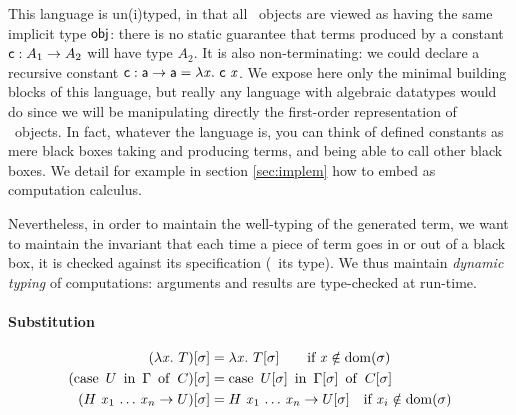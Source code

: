 \documentclass[9pt]{sigplanconf}
\begin{document}
This language is un(i)typed, in that all \LF\ objects are viewed as
having the same implicit type $\text{\textsf{obj}}$: there is no static
guarantee that terms produced by a constant $\text{\textsf{c}} : A_1\to A_2$ will
have type $A_2$. It is also non-terminating: we could declare a
recursive constant $\text{\textsf{c}} : \text{\textsf{a}}\to \text{\textsf{a}} = \lambda{\ensuremath{\text{\textit{x}}}}.\  {\text{\textsf{c}}}\ 
{\text{\textit{x}}}$. We expose here only the minimal building blocks of this
language, but really any language with algebraic datatypes would do
since we will be manipulating directly the first-order representation
of \LF\ objects. In fact, whatever the language is, you can think of
defined constants as mere black boxes taking and producing terms, and
being able to call other black boxes. We detail for example in section
\ref{sec:implem} how to embed  as computation calculus.

Nevertheless, in order to maintain the well-typing of the generated
term, we want to maintain the invariant that each time a piece of term
goes in or out of a black box, it is checked against its specification
(\ie\ its type). We thus maintain \emph{dynamic typing} of
computations: arguments and results are type-checked at run-time.

\paragraph{Substitution}

\begin{align*}
  {(\lambda{\ensuremath{\text{\textit{x}}}}.\ T)}[{\sigma}] &= \lambda{\ensuremath{\text{\textit{x}}}}.\  {{T}[{\sigma}]} \qquad
  \text{if $\text{\textit{x}}\notin\operatorname{dom}{\!(\sigma)}$}\\
  {(\operatorname{case}\ {{U}\ \operatorname{in}\ {\Gamma}}\ \operatorname{of}\  C)}[{\sigma}] &=
  \operatorname{case}\ {{{U}[{\sigma}]}\ \operatorname{in}\ {{\Gamma}[{\sigma}]}}\ \operatorname{of}\  {{C}[{\sigma}]} \\
  {({{H}\  {{\text{\textit{x}}_1}\ {{\ldots}\ {\text{\textit{x}}_n}}}}\to U)}[{\sigma}] &= {{{H}\  {{\text{\textit{x}}_1}\ {{\ldots}\ {\text{\textit{x}}_n}}}}\to {U}[{\sigma}]} \quad \text{if $\text{\textit{x}}_i\notin\operatorname{dom}{\!(\sigma)}$} \\
\end{align*}
\end{document}
